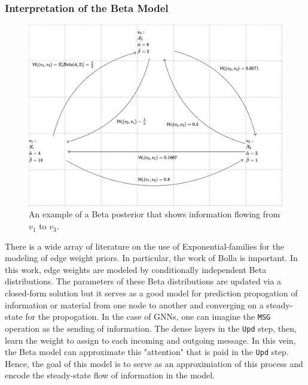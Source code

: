 \subsubsection{Interpretation of the Beta Model}
\begin{figure}[t]
	\centering
	\includegraphics[width=\textwidth]{images/beta_ex.png}
	\caption{An example of a Beta posterior that shows information flowing from $v_1$ to $v_3$.}
	\label{fig:beta-ex}
\end{figure}
There is a wide array of literature on the use of Exponential-families for the modeling of edge weight priors. In particular, the work of Bolla \cite{bolla_estimating_2017} is important. In this work, edge weights are modeled by conditionally independent Beta distributions. The parameters of these Beta distributions are updated via a closed-form solution but it serves as a good model for prediction propogation of information or material from one node to another and converging on a steady-state for the propogation. In the case of GNNs, one can imagine the \verb|MSG| operation as the sending of information. The dense layers in the \verb|Upd| step, then, learn the weight to assign to each incoming and outgoing message. In this vein, the Beta model can approximate this "attention" that is paid in the \verb|Upd| step. Hence, the goal of this model is to serve as an approximiation of this process and encode the steady-state flow of information in the model.
